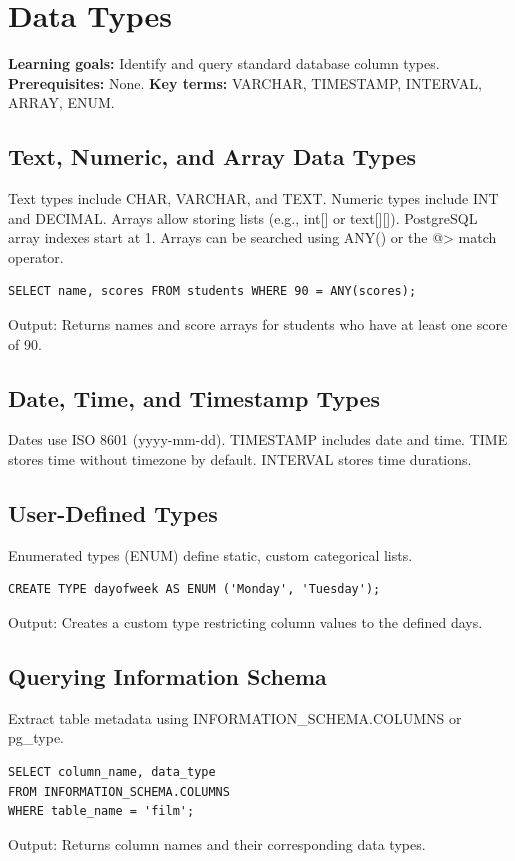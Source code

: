 \documentclass[12pt, a4paper]{article}
\begin{document}
\section{Data Types}
\textbf{Learning goals:} Identify and query standard database column types.
\textbf{Prerequisites:} None.
\textbf{Key terms:} VARCHAR, TIMESTAMP, INTERVAL, ARRAY, ENUM.

\subsection{Text, Numeric, and Array Data Types}
Text types include CHAR, VARCHAR, and TEXT. Numeric types include INT and DECIMAL. Arrays allow storing lists (e.g., int[] or text[][]). PostgreSQL array indexes start at 1. Arrays can be searched using ANY() or the @> match operator.

\begin{verbatim}
SELECT name, scores FROM students WHERE 90 = ANY(scores);
\end{verbatim}
Output: Returns names and score arrays for students who have at least one score of 90.

\subsection{Date, Time, and Timestamp Types}
Dates use ISO 8601 (yyyy-mm-dd). TIMESTAMP includes date and time. TIME stores time without timezone by default. INTERVAL stores time durations.

\subsection{User-Defined Types}
Enumerated types (ENUM) define static, custom categorical lists.

\begin{verbatim}
CREATE TYPE dayofweek AS ENUM ('Monday', 'Tuesday');
\end{verbatim}
Output: Creates a custom type restricting column values to the defined days.

\subsection{Querying Information Schema}
Extract table metadata using INFORMATION\_SCHEMA.COLUMNS or pg\_type.

\begin{verbatim}
SELECT column_name, data_type 
FROM INFORMATION_SCHEMA.COLUMNS 
WHERE table_name = 'film';
\end{verbatim}
Output: Returns column names and their corresponding data types.
\end{document}
